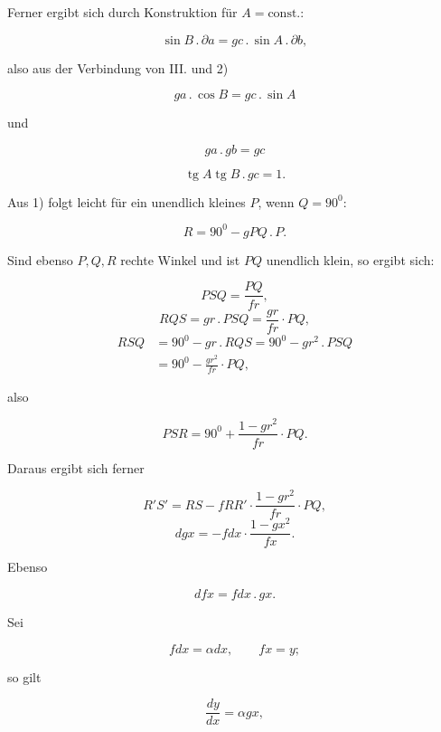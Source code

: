 %
\begin{center}\end{center}

\noindent Ferner ergibt sich durch Konstruktion für $A = \text{const.}$:

\[
\sin B\,.\,\partial a = gc\,.\,\sin A\,.\,\partial b,
\]

\noindent also aus der Verbindung von III. und 2)

\[
ga\,.\,\cos B = gc\,.\,\sin A
\]

\noindent und

\[
\tag*{3)} ga\,.\,gb = gc
\]

\[
\tag*{4)} \operatorname{tg}A\operatorname{tg}B\,.\,gc = 1.
\]

\begin{center}\end{center}

\noindent Aus 1) folgt leicht für ein unendlich kleines $P$, wenn $Q=90^{0}$:

\[
R = 90^{0} - gPQ\,.\,P.
\]

\begin{center}\end{center}

\noindent Sind ebenso $P,Q,R$ rechte Winkel und ist $PQ$ unendlich klein, so ergibt sich:

\[
PSQ = \frac{PQ}{fr},
\]
\[
RQS = gr\,.\,PSQ = \frac{gr}{fr}\cdot PQ,
\]
\[
\begin{aligned}RSQ &= 90^{0} - gr\,.\,RQS = 90^{0} - gr^{2}\,.\,PSQ\\ &= 90^{0} - \frac{gr^{2}}{fr}\cdot PQ,\end{aligned}
\]

\noindent also

\[
PSR = 90^{0} + \frac{1-gr^{2}}{fr}\cdot PQ.
\]

\begin{center}\end{center}

\noindent Daraus ergibt sich ferner

\[
R'S' = RS - fRR'\cdot\frac{1-gr^{2}}{fr}\cdot PQ,
\]
\[
dgx = -fdx\cdot\frac{1-gx^{2}}{fx}.
\]

\noindent Ebenso

\begin{center}\end{center}

\[
dfx = fdx\,.\,gx.
\]

\noindent Sei

\[
fdx = \alpha dx, \qquad fx = y;
\]

\noindent so gilt

\[
\frac{dy}{dx} = \alpha gx,
\]
